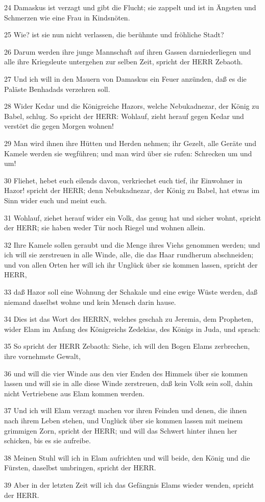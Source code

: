 \par 24 Damaskus ist verzagt und gibt die Flucht; sie zappelt und ist in Ängsten und Schmerzen wie eine Frau in Kindsnöten.
\par 25 Wie? ist sie nun nicht verlassen, die berühmte und fröhliche Stadt?
\par 26 Darum werden ihre junge Mannschaft auf ihren Gassen darniederliegen und alle ihre Kriegsleute untergehen zur selben Zeit, spricht der HERR Zebaoth.
\par 27 Und ich will in den Mauern von Damaskus ein Feuer anzünden, daß es die Paläste Benhadads verzehren soll.
\par 28 Wider Kedar und die Königreiche Hazors, welche Nebukadnezar, der König zu Babel, schlug. So spricht der HERR: Wohlauf, zieht herauf gegen Kedar und verstört die gegen Morgen wohnen!
\par 29 Man wird ihnen ihre Hütten und Herden nehmen; ihr Gezelt, alle Geräte und Kamele werden sie wegführen; und man wird über sie rufen: Schrecken um und um!
\par 30 Fliehet, hebet euch eilends davon, verkriechet euch tief, ihr Einwohner in Hazor! spricht der HERR; denn Nebukadnezar, der König zu Babel, hat etwas im Sinn wider euch und meint euch.
\par 31 Wohlauf, ziehet herauf wider ein Volk, das genug hat und sicher wohnt, spricht der HERR; sie haben weder Tür noch Riegel und wohnen allein.
\par 32 Ihre Kamele sollen geraubt und die Menge ihres Viehs genommen werden; und ich will sie zerstreuen in alle Winde, alle, die das Haar rundherum abschneiden; und von allen Orten her will ich ihr Unglück über sie kommen lassen, spricht der HERR,
\par 33 daß Hazor soll eine Wohnung der Schakale und eine ewige Wüste werden, daß niemand daselbst wohne und kein Mensch darin hause.
\par 34 Dies ist das Wort des HERRN, welches geschah zu Jeremia, dem Propheten, wider Elam im Anfang des Königreichs Zedekias, des Königs in Juda, und sprach:
\par 35 So spricht der HERR Zebaoth: Siehe, ich will den Bogen Elams zerbrechen, ihre vornehmste Gewalt,
\par 36 und will die vier Winde aus den vier Enden des Himmels über sie kommen lassen und will sie in alle diese Winde zerstreuen, daß kein Volk sein soll, dahin nicht Vertriebene aus Elam kommen werden.
\par 37 Und ich will Elam verzagt machen vor ihren Feinden und denen, die ihnen nach ihrem Leben stehen, und Unglück über sie kommen lassen mit meinem grimmigen Zorn, spricht der HERR; und will das Schwert hinter ihnen her schicken, bis es sie aufreibe.
\par 38 Meinen Stuhl will ich in Elam aufrichten und will beide, den König und die Fürsten, daselbst umbringen, spricht der HERR.
\par 39 Aber in der letzten Zeit will ich das Gefängnis Elams wieder wenden, spricht der HERR.

